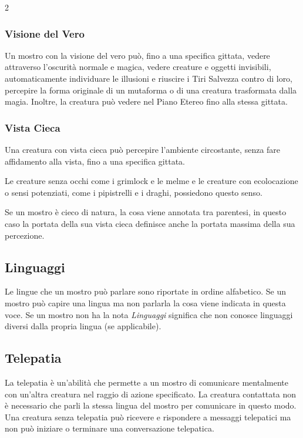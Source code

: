 \begin{multicols}{2}
\subsubsection{Visione del Vero}

Un mostro con la visione del vero può, fino a una specifica gittata, vedere attraverso l'oscurità normale e magica, vedere creature e oggetti invisibili, automaticamente individuare le illusioni e riuscire i Tiri Salvezza contro di loro, percepire la forma originale di un mutaforma o di una creatura trasformata dalla magia. Inoltre, la creatura può vedere nel Piano Etereo fino alla stessa gittata.

\subsubsection{Vista Cieca}

Una creatura con vista cieca può percepire l'ambiente circostante, senza fare affidamento alla vista, fino a una specifica gittata.

Le creature senza occhi come i grimlock e le melme e le creature con ecolocazione o sensi potenziati, come i pipistrelli e i draghi, possiedono questo senso.

Se un mostro è cieco di natura, la cosa viene annotata tra parentesi, in questo caso la portata della sua vista cieca definisce anche la portata massima della sua percezione.

\subsection{Linguaggi}

Le lingue che un mostro può parlare sono riportate in ordine alfabetico. Se un mostro può capire una lingua ma non parlarla la cosa viene indicata in questa voce. Se un mostro non ha la nota \emph{Linguaggi} significa che non conosce linguaggi diversi dalla propria lingua (se applicabile).

\subsection{Telepatia}

La telepatia è un'abilità che permette a un mostro di comunicare mentalmente con un'altra creatura nel raggio di azione specificato. La creatura contattata non è necessario che parli la stessa lingua del mostro per comunicare in questo modo. Una creatura senza telepatia può ricevere e rispondere a messaggi telepatici ma non può iniziare o terminare una conversazione telepatica.


\end{multicols}
